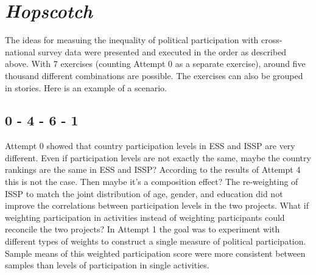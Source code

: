 \documentclass[12pt,]{article}
\begin{document}
\hypertarget{hopscotch}{%
\section{\texorpdfstring{\emph{Hopscotch}}{Hopscotch}}\label{hopscotch}}

The ideas for measuing the inequality of political participation with cross-national survey data were presented and executed in the order as described above. With 7 exercises (counting Attempt 0 as a separate exercise), around five thousand different combinations are possible. The exercises can also be grouped in stories. Here is an example of a scenario.

\hypertarget{section}{%
\subsection{0 - 4 - 6 - 1}\label{section}}

Attempt 0 showed that country participation levels in ESS and ISSP are very different. Even if participation levels are not exactly the same, maybe the country rankings are the same in ESS and ISSP? According to the results of Attempt 4 this is not the case. Then maybe it's a composition effect? The re-weighting of ISSP to match the joint distribution of age, gender, and education did not improve the correlations between participation levels in the two projects. What if weighting participation in activities instead of weighting participants could reconcile the two projects? In Attempt 1 the goal was to experiment with different types of weights to construct a single measure of political participation. Sample means of this weighted participation score were more consistent between samples than levels of participation in single activities.
\end{document}
